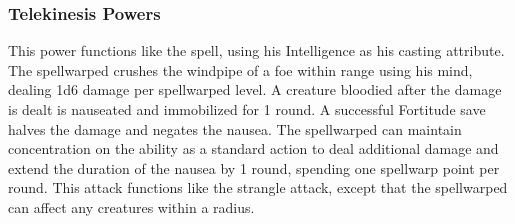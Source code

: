 \subsubsection{Telekinesis Powers}
 This power functions like the  spell, using his Intelligence as his casting attribute.
 The spellwarped crushes the windpipe of a foe within \rngclose range using his mind, dealing 1d6 damage per spellwarped level. A creature bloodied after the damage is dealt is nauseated and immobilized for 1 round. A successful Fortitude save halves the damage and negates the nausea. The spellwarped can maintain concentration on the ability as a standard action to deal additional damage and extend the duration of the nausea by 1 round, spending one spellwarp point per round.
 This attack functions like the strangle attack, except that the spellwarped can affect any creatures within a \areasmall radius.

